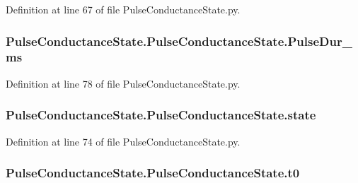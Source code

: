 Definition at line 67 of file Pulse\+Conductance\+State.\+py.

\subsubsection[{\texorpdfstring{Pulse\+Dur\+\_\+ms}{PulseDur_ms}}]{\setlength{\rightskip}{0pt plus 5cm}Pulse\+Conductance\+State.\+Pulse\+Conductance\+State.\+Pulse\+Dur\+\_\+ms}\hypertarget{class_pulse_conductance_state_1_1_pulse_conductance_state_afda03b180fc3cb619de615632e725a6f}{}\label{class_pulse_conductance_state_1_1_pulse_conductance_state_afda03b180fc3cb619de615632e725a6f}


Definition at line 78 of file Pulse\+Conductance\+State.\+py.

\subsubsection[{\texorpdfstring{state}{state}}]{\setlength{\rightskip}{0pt plus 5cm}Pulse\+Conductance\+State.\+Pulse\+Conductance\+State.\+state}\hypertarget{class_pulse_conductance_state_1_1_pulse_conductance_state_ac85aa714a187088e1b31fa2369ed4bca}{}\label{class_pulse_conductance_state_1_1_pulse_conductance_state_ac85aa714a187088e1b31fa2369ed4bca}


Definition at line 74 of file Pulse\+Conductance\+State.\+py.

\subsubsection[{\texorpdfstring{t0}{t0}}]{\setlength{\rightskip}{0pt plus 5cm}Pulse\+Conductance\+State.\+Pulse\+Conductance\+State.\+t0}\hypertarget{class_pulse_conductance_state_1_1_pulse_conductance_state_a55f44caf230fc3899811924118705f56}{}\label{class_pulse_conductance_state_1_1_pulse_conductance_state_a55f44caf230fc3899811924118705f56}


